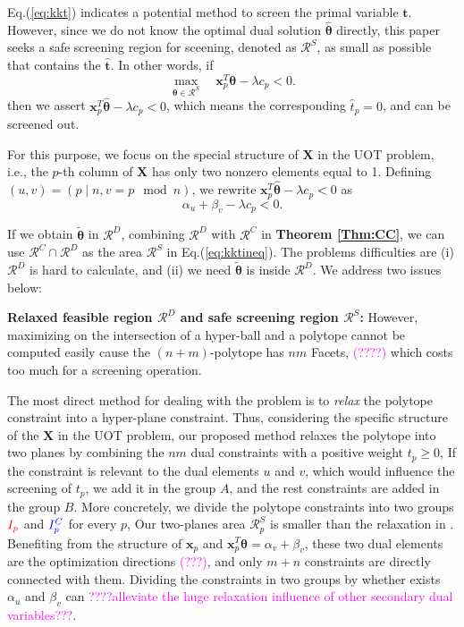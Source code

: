 \documentclass[twoside]{article}
\theoremstyle{plain}
\newcommand{\mat}[1]{\mathbf{#1}}
\renewcommand{\vec}[1]{\bm{#1}}
\newcommand{\changeHK}[1]{\textcolor{red}{#1}}
\newcommand{\changeXS}[1]{\textcolor{blue}{#1}}
\newcommand{\note}[1]{\textcolor{magenta}{#1}}
\begin{document}
Eq.(\ref{eq:kkt}) indicates a potential method to screen the primal variable $\vec{t}$. However, since we do not know the optimal dual solution $\hat{\vec{\theta}}$ directly, this paper seeks a safe screening region for sceening, denoted as $\mathcal{R}^{S}$, as small as possible that contains the $\hat{\vec{t}}$. In other words, if
\begin{equation}
\label{eq:kktineq}
\max_{\vec{\theta} \in \mathcal{R}^S}\quad  \vec{x}_p^T\vec{\theta} -\lambda c_p < 0.
\end{equation}
then we assert 
$\vec{x}_p^T\hat{\vec{\theta}} -\lambda c_p < 0$,
which means the corresponding $\hat{{t}}_p = 0$, and can be screened out. 

For this purpose, we focus on the special structure of $\mat{X}$ in the UOT problem, i.e., the $p$-th column of $\mat{X}$ has only two nonzero elements equal to 1. Defining $(u,v)=(p \mid n,v= p \mod n)$, we rewrite $\vec{x}_p^T\hat{\vec{\theta}} -\lambda c_p < 0$ as
%
\begin{equation}
\alpha_{u} + \beta_{v}-\lambda c_p < 0.
\end{equation}

If we obtain $\tilde{\vec{\theta}}$ in $\mathcal{R}^{D}$, combining $\mathcal{R}^{D}$ with $\mathcal{R}^{C}$ in {\bf Theorem \ref{Thm:CC}}, we can use $\mathcal{R}^{C}\cap\mathcal{R}^{D}$ as the area $\mathcal{R}^{S}$ in Eq.(\ref{eq:kktineq}). The problems difficulties are (i) $\mathcal{R}^{D}$ is hard to calculate, and (ii) we need $\tilde{\vec{\theta}}$ is inside $\mathcal{R}^{D}$. We address two issues below:

{\bf Relaxed feasible region $\mathcal{R}^D$ and safe screening region $\mathcal{R}^S$:} 
However, maximizing on the intersection of a hyper-ball and a polytope cannot be computed easily cause the $(n+m)$-polytope has $nm$ Facets, \note{(????)} which costs too much for a screening operation. 

The most direct method for dealing with the problem is to {\it relax} the polytope constraint into a hyper-plane constraint. Thus, considering the specific structure of the $\mat X$ in the UOT problem, our proposed method relaxes the polytope into two planes by combining the $nm$ dual constraints with a positive weight $t_p \geq 0$, If the constraint is relevant to the dual elements $u$ and $v$, which would influence the screening of $t_p$, we add it in the group $A$, and the rest constraints are added in the group $B$. 
%
More concretely, we divide the polytope constraints into two groups $\changeHK{I_p}$ and $\changeXS{{I}^{C}_p}$ for every $p$, Our two-planes area $\mathcal{R}^S_{p}$ is smaller than the relaxation in \citep{Yamada_NIPS_2021}. Benefiting from the structure of $\vec{x}_p$ and $\vec{x}_p^T\vec{\theta} = {\alpha}_{v} + {\beta}_{v}$, these two dual elements are the optimization directions \note{(???)}, and only $m+n$ constraints are directly connected with them. Dividing the constraints in two groups by whether exists $\alpha_{u}$ and ${\beta}_{v}$ can \note{????alleviate the huge relaxation influence of other secondary dual variables???}. 
\end{document}
